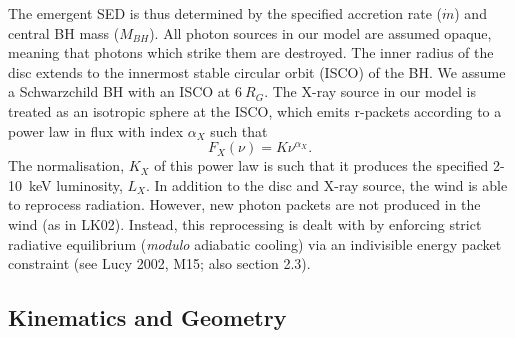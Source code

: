 \documentclass[preprint, a4paper, 11pt]{aastex}
\begin{document}
The emergent SED is thus determined by the specified accretion rate ($\dot{m}$)
and central BH mass ($M_{BH}$).
All photon sources in our model are assumed opaque, meaning
that photons which strike them are destroyed.
The inner radius of the disc extends to the innermost 
stable circular orbit (ISCO) of the BH. 
We assume a Schwarzchild BH with an ISCO at $6~R_G$.
The X-ray source in our model is treated as an isotropic sphere at the ISCO,
which emits r-packets according to a power law in flux with index $\alpha_X$ such that
\begin{equation}
F_X (\nu) = K \nu^{\alpha_X}.
\end{equation}
The normalisation, $K_X$ of this power law is such that it 
produces the specified 2-10~keV luminosity, $L_X$.
In addition to the disc and X-ray source, 
the wind is able to reprocess radiation. However, new 
photon packets are not produced in the wind (as in LK02). 
Instead, this reprocessing is dealt with by enforcing strict
radiative equilibrium ({\em modulo} adiabatic cooling)
via an indivisible energy packet
constraint (see Lucy 2002, M15; also section 2.3).









\subsection{Kinematics and Geometry}
\end{document}
